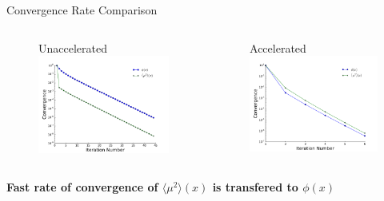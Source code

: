 \documentclass[10pt]{beamer}
\newcommand{\edd}{\langle \mu^2 \rangle}
\begin{document}
\begin{frame}{Convergence Rate Comparison}

	
    \begin{columns}
    \begin{column}{.5\paperwidth}
    \begin{figure} \centering
    	Unaccelerated
        \includegraphics[width=.45\paperwidth]{figs/converge_una.pdf}
    \end{figure}
    \end{column}
    \pause
    \begin{column}{.5\paperwidth}
    \begin{figure} \centering
    	Accelerated
        \includegraphics[width=.45\paperwidth]{figs/converge_acc.pdf}
    \end{figure}
   	\end{column}
   	\end{columns}

   	\pause
    \vfill
    \centerline{\textbf{Fast rate of convergence of $\edd(x)$ is transfered to $\phi(x)$}}

\end{frame}
\end{document}
